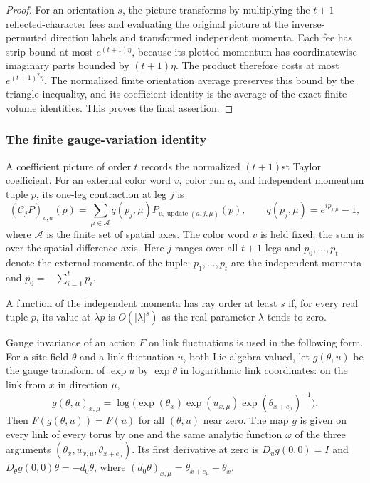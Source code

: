 \begin{proof}
For an orientation $s$, the picture transforms by multiplying the $t+1$
reflected-character fees and evaluating the original picture at the
inverse-permuted direction labels and transformed independent momenta.
Each fee has strip bound at most $e^{(t+1)\eta}$, because its plotted
momentum has coordinatewise imaginary parts bounded by $(t+1)\eta$.
The product therefore costs at most $e^{(t+1)^2\eta}$. The normalized
finite orientation average preserves this bound by the triangle
inequality, and its coefficient identity is the average of the exact
finite-volume identities. This proves the final assertion.
\end{proof}

\subsubsection{The finite gauge-variation identity}

A coefficient picture of order $t$ records the normalized $(t+1)$st
Taylor coefficient. For an external color word $v$, color run $a$, and
independent momentum tuple $p$, its one-leg contraction at leg $j$ is
\[
 (\mathcal C_jP)_{v,a}(p)=
   \sum_{\mu\in\mathcal A}q(p_j,\mu)
       P_{v,\operatorname{update}(a,j,\mu)}(p),
 \qquad q(p_j,\mu)=e^{ip_{j,\mu}}-1,
\]
where $\mathcal A$ is the finite set of spatial axes. The color word
$v$ is held fixed; the sum is over the spatial difference axis. Here
$j$ ranges over all $t+1$ legs and $p_0,\ldots,p_t$ denote the external
momenta of the tuple: $p_1,\ldots,p_t$ are the independent momenta and
$p_0=-\sum_{i=1}^tp_i$.

A function of the independent momenta has ray order at least $s$ if,
for every real tuple $p$, its value at $\lambda p$ is $O(|\lambda|^s)$
as the real parameter $\lambda$ tends to zero.

Gauge invariance of an action $F$ on link fluctuations is used in the
following form. For a site field $\theta$ and a link fluctuation $u$,
both Lie-algebra valued, let $g(\theta,u)$ be the gauge transform of
$\exp u$ by $\exp\theta$ in logarithmic link coordinates: on the link
from $x$ in direction $\mu$,
\[
 g(\theta,u)_{x,\mu}
   =\log\bigl(\exp(\theta_x)\exp(u_{x,\mu})
                 \exp(\theta_{x+e_\mu})^{-1}\bigr).
\]
Then $F(g(\theta,u))=F(u)$ for all $(\theta,u)$ near zero. The map $g$
is given on every link of every torus by one and the same analytic
function $\omega$ of the three arguments
$(\theta_x,u_{x,\mu},\theta_{x+e_\mu})$. Its first derivative at zero
is $D_ug(0,0)=I$ and $D_\theta g(0,0)\theta=-d_0\theta$, where
$(d_0\theta)_{x,\mu}=\theta_{x+e_\mu}-\theta_x$.


